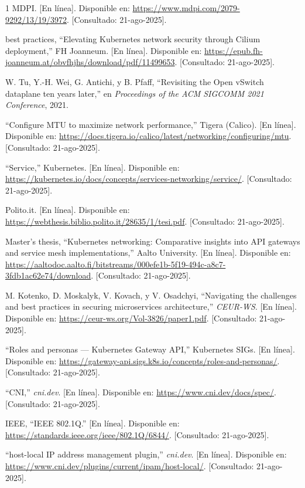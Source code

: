 \documentclass[journal]{IEEEtran}
\begin{document}
\begin{thebibliography}{1}
MDPI. [En línea]. Disponible en: \url{https://www.mdpi.com/2079-9292/13/19/3972}. [Consultado: 21-ago-2025].

best practices, ``Elevating Kubernetes network security through Cilium deployment,'' FH Joanneum. [En línea]. Disponible en: \url{https://epub.fh-joanneum.at/obvfhjhs/download/pdf/11499653}. [Consultado: 21-ago-2025].

W. Tu, Y.-H. Wei, G. Antichi, y B. Pfaff, ``Revisiting the Open vSwitch dataplane ten years later,'' en \emph{Proceedings of the ACM SIGCOMM 2021 Conference}, 2021.

``Configure MTU to maximize network performance,'' Tigera (Calico). [En línea]. Disponible en: \url{https://docs.tigera.io/calico/latest/networking/configuring/mtu}. [Consultado: 21-ago-2025].

``Service,'' Kubernetes. [En línea]. Disponible en: \url{https://kubernetes.io/docs/concepts/services-networking/service/}. [Consultado: 21-ago-2025].

Polito.it. [En línea]. Disponible en: \url{https://webthesis.biblio.polito.it/28635/1/tesi.pdf}. [Consultado: 21-ago-2025].

Master’s thesis, ``Kubernetes networking: Comparative insights into API gateways and service mesh implementations,'' Aalto University. [En línea]. Disponible en: \url{https://aaltodoc.aalto.fi/bitstreams/000efe1b-5f19-494c-a8c7-3fdb1ac62e74/download}. [Consultado: 21-ago-2025].

M. Kotenko, D. Moskalyk, V. Kovach, y V. Osadchyi, ``Navigating the challenges and best practices in securing microservices architecture,'' \emph{CEUR-WS}. [En línea]. Disponible en: \url{https://ceur-ws.org/Vol-3826/paper1.pdf}. [Consultado: 21-ago-2025].

``Roles and personas — Kubernetes Gateway API,'' Kubernetes SIGs. [En línea]. Disponible en: \url{https://gateway-api.sigs.k8s.io/concepts/roles-and-personas/}. [Consultado: 21-ago-2025].

``CNI,'' \emph{cni.dev}. [En línea]. Disponible en: \url{https://www.cni.dev/docs/spec/}. [Consultado: 21-ago-2025].

IEEE, ``IEEE 802.1Q.'' [En línea]. Disponible en: \url{https://standards.ieee.org/ieee/802.1Q/6844/}. [Consultado: 21-ago-2025].

``host-local IP address management plugin,'' \emph{cni.dev}. [En línea]. Disponible en: \url{https://www.cni.dev/plugins/current/ipam/host-local/}. [Consultado: 21-ago-2025].


\end{thebibliography}
\end{document}
